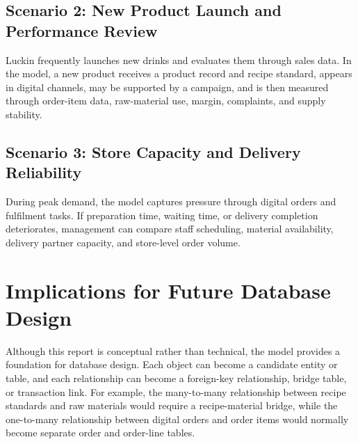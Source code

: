 \documentclass[12pt,a4paper]{article}
\begin{document}
\subsection{Scenario 2: New Product Launch and Performance Review}

Luckin frequently launches new drinks and evaluates them through sales data. In the model, a new product receives a product record and recipe standard, appears in digital channels, may be supported by a campaign, and is then measured through order-item data, raw-material use, margin, complaints, and supply stability.

\subsection{Scenario 3: Store Capacity and Delivery Reliability}

During peak demand, the model captures pressure through digital orders and fulfilment tasks. If preparation time, waiting time, or delivery completion deteriorates, management can compare staff scheduling, material availability, delivery partner capacity, and store-level order volume.

\section{Implications for Future Database Design}

Although this report is conceptual rather than technical, the model provides a foundation for database design. Each object can become a candidate entity or table, and each relationship can become a foreign-key relationship, bridge table, or transaction link. For example, the many-to-many relationship between recipe standards and raw materials would require a recipe-material bridge, while the one-to-many relationship between digital orders and order items would normally become separate order and order-line tables.
\end{document}
